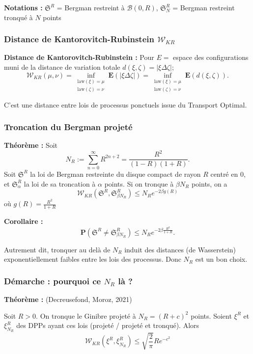 \documentclass[9pt]{beamer}
\begin{document}
\begin{frame}
    \textbf{Notations :} $ \mathfrak{S}^R $ = Bergman restreint à $ \mathcal B(0,R) $, $ \mathfrak{S}_{N}^R $ = Bergman restreint tronqué à $N$ points

\end{frame}\begin{frame}\frametitle{Distance de Kantorovitch-Rubinstein $ \mathcal W_{KR} $}

    \textbf{Distance de Kantorovitch-Rubinstein : } Pour $ E =$ espace des configurations muni de la distance de variation totale $ d(\xi, \zeta) = | \xi \Delta \zeta| $;
    \[
    \mathcal{W}_{KR}(\mu, \nu) = \inf_{\substack{\text{law}(\xi)=\mu \\ \text{law}(\zeta)=\nu}} \mathbf{E}(|\xi \Delta \zeta|) = \inf_{\substack{\text{law}(\xi)=\mu \\ \text{law}(\zeta)=\nu}} \mathbf{E}(d(\xi, \zeta)).
    \]

    C'est une distance entre lois de processus ponctuels issue du Transport Optimal.

\end{frame}\begin{frame}\frametitle{Troncation du Bergman projeté}

    \textbf{Théorème :} Soit
    \[
    N_R := \sum_{n=0}^\infty R^{2n+2} = \frac{R^2}{(1-R)(1+R)}.
    \]
    Soit $\mathfrak{S}^R$ la loi de Bergman restreinte du disque compact de rayon $R$ centré en $0$, et $\mathfrak{S}_\alpha^R$ la loi de sa troncation à $\alpha$ points. Si on tronque à $\beta N_R$ points, on a
    \[
        \mathcal{W}_{KR}(\mathfrak{S}^R, \mathfrak{S}_{\beta N_R}^R) \leqslant N_R e^{-2\beta g(R)}
    \]
    où $ g(R) = \frac{R^2}{1+R} $

    \textbf{Corollaire :}
    \[
    \mathbf{P}(\mathfrak{S}^R \neq \mathfrak{S}_{\beta N_R}^R) \leqslant N_R e^{-2\beta \frac{R^2}{1+R}}.
    \]

    Autrement dit, tronquer au delà de $ N_R $ induit des distances (de Wasserstein) exponentiellement faibles entre les lois des processus. Donc $ N_R $ est un bon choix.

\end{frame}\begin{frame}\frametitle{Démarche : pourquoi ce $ N_R $ là ? }

    \textbf{Théorème :} (Decreusefond, Moroz, 2021)
    
    Soit $R > 0$. On tronque le Ginibre projeté à $ N_R = (R+c)^2 $ points. Soient $ \xi^R $ et $ \xi^R_{N_R} $ des DPPs ayant ces lois (projeté / projeté et tronqué). Alors
    \[
         \mathcal W_{KR}(\xi^R, \xi^R_{N_R}) \leqslant \sqrt{\frac{2}{\pi}} R e^{-c^2}
    \]


\end{frame}
\end{document}
